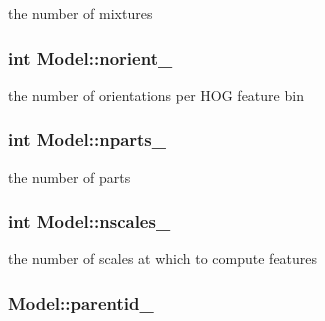 the number of mixtures 

\hypertarget{classModel_a40c5597450f8efb960bb7da74890e73c}{
\subsubsection[{norient\-\_\-}]{\setlength{\rightskip}{0pt plus 5cm}int Model\-::norient\-\_\-\hspace{0.3cm}{\ttfamily [protected]}}}\label{classModel_a40c5597450f8efb960bb7da74890e73c}


the number of orientations per H\-O\-G feature bin 

\hypertarget{classModel_ae8b3d33dbc43d6ab07c1553c9a1bbc2e}{
\subsubsection[{nparts\-\_\-}]{\setlength{\rightskip}{0pt plus 5cm}int Model\-::nparts\-\_\-\hspace{0.3cm}{\ttfamily [protected]}}}\label{classModel_ae8b3d33dbc43d6ab07c1553c9a1bbc2e}


the number of parts 

\hypertarget{classModel_ab711641b36aa9b8b578acf151af55aa7}{
\subsubsection[{nscales\-\_\-}]{\setlength{\rightskip}{0pt plus 5cm}int Model\-::nscales\-\_\-\hspace{0.3cm}{\ttfamily [protected]}}}\label{classModel_ab711641b36aa9b8b578acf151af55aa7}


the number of scales at which to compute features 

\hypertarget{classModel_a4e1151fe7911f52ec75944eff1b257f4}{
\subsubsection[{parentid\-\_\-}]{ Model\-::parentid\-\_\-\hspace{0.3cm}{\ttfamily [protected]}}}\label{classModel_a4e1151fe7911f52ec75944eff1b257f4}


